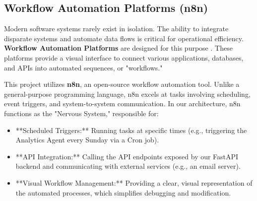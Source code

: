 

\subsection{Workflow Automation Platforms (n8n)}
\label{subsec:n8n}

Modern software systems rarely exist in isolation. The ability to integrate disparate systems and automate data flows is critical for operational efficiency. \textbf{Workflow Automation Platforms} are designed for this purpose \cite{FIND_CITATION_PLEASE}. These platforms provide a visual interface to connect various applications, databases, and APIs into automated sequences, or "workflows."

This project utilizes \textbf{n8n}, an open-source workflow automation tool. Unlike a general-purpose programming language, n8n excels at tasks involving scheduling, event triggers, and system-to-system communication. In our architecture, n8n functions as the "Nervous System," responsible for:
\begin{itemize}
    \item **Scheduled Triggers:** Running tasks at specific times (e.g., triggering the Analytics Agent every Sunday via a Cron job).
    \item **API Integration:** Calling the API endpoints exposed by our FastAPI backend and communicating with external services (e.g., an email server).
    \item **Visual Workflow Management:** Providing a clear, visual representation of the automated processes, which simplifies debugging and modification.
\end{itemize}

